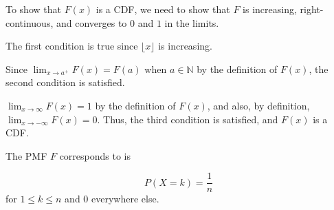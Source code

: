 To show that $F(x)$ is a CDF, we need to show that $F$ is increasing,
right-continuous, and converges to $0$ and $1$ in the limits.

The first condition is true since $\lfloor x \rfloor$ is increasing.

Since $\lim_{x \to a^{+}} F(x) = F(a)$ when $a \in \mathbb{N}$ by the 
definition of $F(x)$, the second condition is satisfied.

$\lim_{x \to \infty}F(x) = 1$ by the definition of $F(x)$, and also, by
definition, $\lim_{x \to -\infty}F(x) = 0$. Thus, the third condition is
satisfied, and $F(x)$ is a CDF.

The PMF $F$ corresponds to is

$$P(X = k) = \frac{1}{n}$$ for $1 \leq k \leq n$ and $0$ everywhere else.